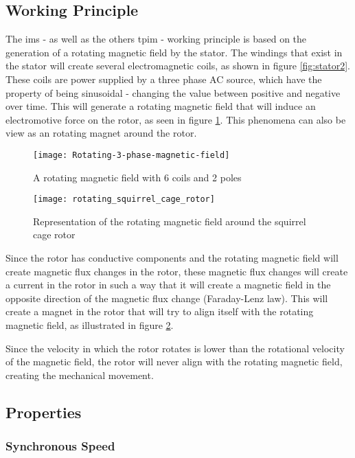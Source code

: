 \subsection{Working Principle}

The \acrfull{ims} - as well as the others \acrfull{tpim} - working principle is based on the generation of a rotating magnetic field by the stator. The windings that exist in the stator will create several electromagnetic coils, as shown in figure \ref{fig:stator2}. These coils are power supplied by a three phase AC source, which have the property of being sinusoidal - changing the value between positive and negative over time. This will generate a rotating magnetic field that will induce an electromotive force on the rotor, as seen in figure \ref{fig:rotating_3pmf}. 
This phenomena can also be view as an rotating magnet around the rotor. 


\begin{figure}[htbp]
	\centering
	\texttt{[image: Rotating-3-phase-magnetic-field]}
	\caption{A rotating magnetic field with 6 coils and 2 poles}
	\label{fig:rotating_3pmf}
\end{figure}

\begin{figure}[htbp]
	\centering
	\texttt{[image: rotating\_squirrel\_cage\_rotor]}
	\caption{Representation of the rotating magnetic field around the squirrel cage rotor}
	\label{fig:rotating_3pscr}
\end{figure}

Since the rotor has conductive components and the rotating magnetic field will create magnetic flux changes in the rotor, these magnetic flux changes will create a current in the rotor in such a way that it will create a magnetic field in the opposite direction of the magnetic flux change (Faraday-Lenz law).
This will create a magnet in the rotor that will try to align itself with the rotating magnetic field, as illustrated in figure \ref{fig:rotating_3pscr}.

Since the velocity in which the rotor rotates is lower than the rotational velocity of the magnetic field, the rotor will never align with the rotating magnetic field, creating the mechanical movement.

\subsection{Properties}

\subsubsection{Synchronous Speed}

